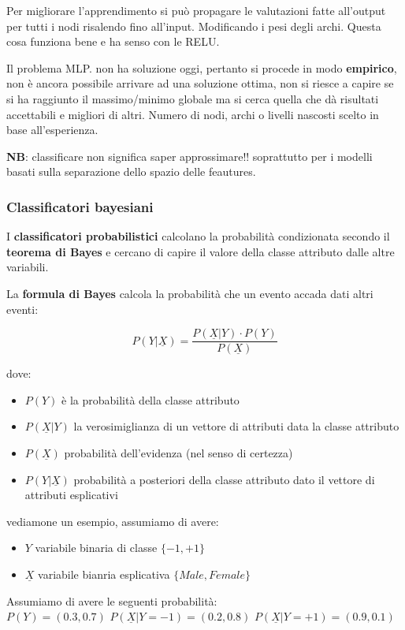 Per migliorare l'apprendimento si pu\`o propagare le valutazioni fatte all'output per tutti i nodi risalendo fino all'input. Modificando i pesi degli archi. Questa cosa funziona bene e ha senso con le RELU.

Il problema MLP. non ha soluzione oggi, pertanto si procede in modo \textbf{empirico}, non \`e ancora possibile arrivare ad una soluzione ottima, non si riesce a capire se si ha raggiunto il massimo/minimo globale ma si cerca quella che dà risultati accettabili e migliori di altri. Numero di nodi, archi o livelli nascosti scelto in base all'esperienza.

\textbf{NB}: classificare non significa saper approssimare!! soprattutto per i modelli basati sulla separazione dello spazio delle feautures.

\subsubsection{Classificatori bayesiani}
I \textbf{classificatori probabilistici} calcolano la probabilit\`a condizionata secondo il \textbf{teorema di Bayes} e cercano di capire il valore della classe attributo dalle altre variabili. 

\begin{defn}

La \textbf{formula di Bayes} calcola la probabilità che un evento accada dati altri eventi: 

\[P(Y|\underline{X}) = \frac{P(\underline{X}|Y) \cdot P(Y)}{P(\underline{X})}\]

dove:
\begin{itemize}
	\item $P(Y)$ è la probabilit\`a della classe attributo
	\item $P(\underline{X}|Y)$ la verosimiglianza di un vettore di attributi data la classe attributo
	\item $P(\underline{X})$ probabilit\`a dell'evidenza (nel senso di certezza)
	\item $P(Y|\underline{X})$ probabilit\`a a posteriori della classe attributo dato il vettore di attributi esplicativi
\end{itemize}

vediamone un esempio, assumiamo di avere:
\begin{itemize}
	\item $Y$ variabile binaria di classe $\{-1,+1\}$
	\item $\underline{X}$ variabile bianria esplicativa $\{Male, Female\}$
\end{itemize}
\end{defn}
Assumiamo di avere le seguenti probabilità: 
\\
$P(Y) = (0.3,0.7)$ \quad $P(\underline{X}|Y=-1) = (0.2,0.8)$ \quad $P(\underline{X}|Y = +1) = (0.9,0.1)$

